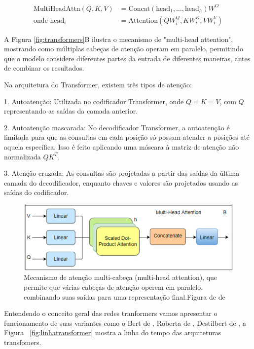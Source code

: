 \begin{equation}
\begin{aligned}
\text{MultiHeadAttn}(Q, K, V) &= \text{Concat}(\text{head}_1, \ldots, \text{head}_h)W^O \\
\text{onde } \text{head}_i &= \text{Attention}(QW_i^{Q}, KW_i^{K}, VW_i^{V})
\label{eq:MultAttention}
\end{aligned}
\end{equation}

A Figura \ref{fig:transformers}B ilustra o mecanismo de "multi-head attention", mostrando como múltiplas cabeças de atenção operam em paralelo, permitindo que o modelo considere diferentes partes da entrada de diferentes maneiras, antes de combinar os resultados.

Na arquitetura do Transformer, existem três tipos de atenção:

1. Autoatenção: Utilizada no codificador Transformer, onde \(Q = K = V\), com \(Q\) representando as saídas da camada anterior.
   
2. Autoatenção mascarada: No decodificador Transformer, a autoatenção é limitada para que as consultas em cada posição só possam atender a posições até aquela específica. Isso é feito aplicando uma máscara à matriz de atenção não normalizada \(QK^T\).

3. Atenção cruzada: As consultas são projetadas a partir das saídas da última camada do decodificador, enquanto chaves e valores são projetados usando as saídas do codificador.

\begin{figure}
    \centering
    \includegraphics[width=1.o\linewidth]{capitulos//figuras/multi-head.png}
    \caption{Mecanismo de atenção multi-cabeça (multi-head attention), que permite que várias cabeças de atenção operem em paralelo, combinando suas saídas para uma representação final.Figura de de \textcite{THIRUNAVUKARASU2024100648}}
    \label{fig:enter-label}
\end{figure}

Entendendo o conceito geral das redes tranformers vamos apresentar o funcionamento de suas variantes como o Bert de \textcite{Develin}, Roberta de \textcite{Roberta}, Destilbert de \textcite{https://doi.org/10.48550/arxiv.1910.01108}, a Figura ~\ref{fig:linhatransformer} mostra a linha do tempo das arquiteturas transfomers.

